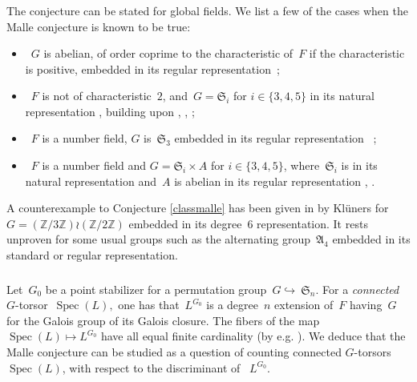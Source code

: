\documentclass[a4paper,english,12pt]{amsart}
\newcommand{\ZZ}{\mathbb{Z}}
\newcommand{\Akk}{\mathfrak A_4}
\DeclareMathOperator{\Spec}{Spec}
\numberwithin{equation}{subsection}
\begin{document}
\subsubsection{}The conjecture can be stated for global fields. We list a few of the cases when the Malle conjecture is known to be true:
\begin{itemize}
\item~$G$ is abelian, of order coprime to the characteristic of~$F$ if the characteristic is positive, embedded in its regular representation~\cite{Wright};
\item~$F$ is not of characteristic~$2$, and~$G=\mathfrak S_i$ for $i\in\{3,4,5\}$ in its natural representation \cite{https://doi.org/10.48550/arxiv.1512.03035}, building upon \cite{dave}, \cite{densityquartic}, \cite{densityquintic};
\item~$F$ is a number field, $G$ is~$\mathfrak S_3$ embedded in its regular representation~ \cite{sexticsthree};
\item~$F$ is a number field and $G=\mathfrak S_i\times A$ for $i\in\{3, 4, 5\}$, where~$\mathfrak S_i$ is in its natural representation and~$A$ is abelian in its regular representation \cite{https://doi.org/10.48550/arxiv.2004.04651}, \cite{wangmalle}.
\end{itemize}
A counterexample to Conjecture \ref{classmalle} has been given in \cite{Kluners} by Kl\" uners for $G=(\ZZ/3\ZZ)\wr (\ZZ/2\ZZ)$ embedded in its degree~$6$ representation. %
It rests unproven for some usual groups such as the alternating group~$\Akk$ embedded in its standard or regular representation. %
\subsubsection{}\label{malleortorsors} Let~$G_0$ be a point stabilizer for a permutation group~$G\hookrightarrow~\mathfrak S_n.$ For a {\it connected} $G$-torsor~$\Spec(L),$ one has that~$L^{G_0}$ is a degree~$n$ extension of~$F$ having~$G$ for the Galois group of its Galois closure. The fibers of the map $\Spec(L)\mapsto L^{G_0}$ have all equal finite cardinality (by e.g. \cite[Lemma 5.8]{https://doi.org/10.48550/arxiv.1408.3912}). %
We deduce that the Malle conjecture can be studied as a question of counting connected $G$-torsors~$\Spec(L)$, with respect to the discriminant of ~$L^{G_0}$. %
\end{document}
